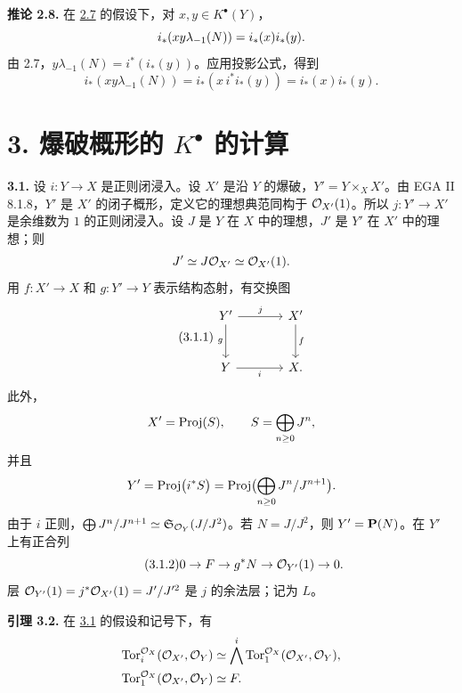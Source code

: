 \textbf{推论 2.8.} 在 \hyperlink{sga6.e07.prop.2-7}{2.7} 的假设下，对 \(x,y\in K^\bullet(Y)\)，
\begin{equation}\notag
i_*(xy\lambda_{-1}(N))=i_*(x)i_*(y).
\end{equation}
由 2.7，\(y\lambda_{-1}(N)=i^*(i_*(y))\)。应用投影公式，得到
\[
 i_*(xy\lambda_{-1}(N))=i_*(x\,i^*i_*(y))=i_*(x)i_*(y).
\]


\section*{3. 爆破概形的 \texorpdfstring{$K^\bullet$}{K} 的计算}

\textbf{3.1.} 设 \(i:Y\to X\) 是正则闭浸入。设 \(X'\) 是沿 \(Y\) 的爆破，\(Y'=Y\times_X X'\)。由 EGA II 8.1.8，\(Y'\) 是 \(X'\) 的闭子概形，定义它的理想典范同构于 \(\mathcal O_{X'}(1)\)。所以 \(j:Y'\to X'\) 是余维数为 \(1\) 的正则闭浸入。设 \(J\) 是 \(Y\) 在 \(X\) 中的理想，\(J'\) 是 \(Y'\) 在 \(X'\) 中的理想；则
\[
J'\simeq J\mathcal O_{X'}\simeq\mathcal O_{X'}(1).
\]
用 \(f:X'\to X\) 和 \(g:Y'\to Y\) 表示结构态射，有交换图
\begin{equation}\tag{3.1.1}
\begin{tikzcd}[column sep=large,row sep=large]
Y' \arrow[r,"j"] \arrow[d,"g"'] & X' \arrow[d,"f"]\\
Y \arrow[r,"i"'] & X.
\end{tikzcd}
\end{equation}
此外，
\[
X'=\operatorname{Proj}(S),\qquad S=\bigoplus_{n\ge0}J^n,
\]
并且
\[
Y'=\operatorname{Proj}\bigl(i^*S\bigr)
=\operatorname{Proj}\bigl(\bigoplus_{n\ge0}J^n/J^{n+1}\bigr).
\]
由于 \(i\) 正则，\(\bigoplus J^n/J^{n+1}\simeq\mathfrak S_{\mathcal O_Y}(J/J^2)\)。若 \(N=J/J^2\)，则 \(Y'=\mathbf P(N)\)。在 \(Y'\) 上有正合列
\begin{equation}\tag{3.1.2}
0\to F\to g^*N\to\mathcal O_{Y'}(1)\to0.
\end{equation}
层 \(\mathcal O_{Y'}(1)=j^*\mathcal O_{X'}(1)=J'/J'^2\) 是 \(j\) 的余法层；记为 \(L\)。

\textbf{引理 3.2.} 在 \hyperlink{sga6.e07.para.3-1}{3.1} 的假设和记号下，有
\begin{align}
\operatorname{Tor}_i^{\mathcal O_X}(\mathcal O_{X'},\mathcal O_Y)&\simeq
\bigwedge^i\operatorname{Tor}_1^{\mathcal O_X}(\mathcal O_{X'},\mathcal O_Y),\notag\\
\operatorname{Tor}_1^{\mathcal O_X}(\mathcal O_{X'},\mathcal O_Y)&\simeq F.\notag
\end{align}

